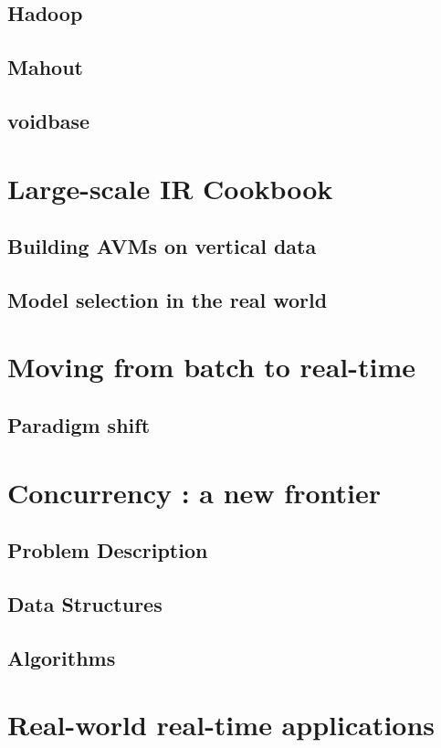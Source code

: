 \documentclass[]{book}    %
\begin{document}
\section{Hadoop}
\section{Mahout}
\section{voidbase}

\chapter{Large-scale IR Cookbook}
\section{Building AVMs on vertical data}
\section{Model selection in the real world}

\chapter{Moving from batch to real-time}
\section{Paradigm shift}

\chapter{Concurrency : a new frontier}
\section{Problem Description}
\section{Data Structures}
\section{Algorithms}

\chapter{Real-world real-time applications}
\end{document}
